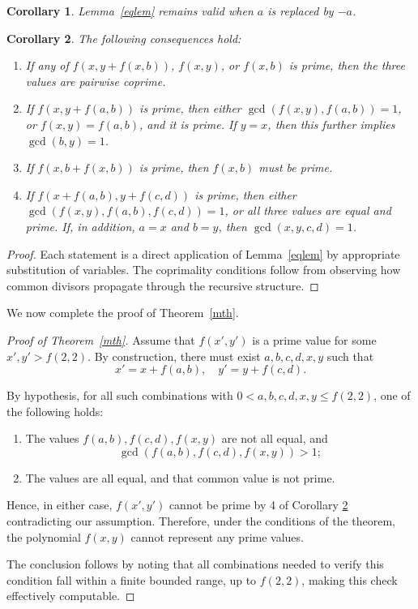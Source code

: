 \documentclass[a4paper,11pt]{article}
\newtheorem{corollary}{Corollary}
\begin{document}
	\begin{corollary}
		Lemma~\ref{eqlem} remains valid when $a$ is replaced by $-a$.
	\end{corollary}
	
	\begin{corollary}\label{cor:m}
		The following consequences hold:
		\begin{enumerate}
			\item If any of $f(x, y + f(x, b))$, $f(x, y)$, or $f(x, b)$ is prime, then the three values are pairwise coprime.
			\item If $f(x, y + f(a, b))$ is prime, then either $\gcd(f(x, y), f(a, b)) = 1$, or $f(x, y) = f(a, b)$, and it is prime. If $y = x$, then this further implies $\gcd(b, y) = 1$.
			\item If $f(x, b + f(x, b))$ is prime, then $f(x, b)$ must be prime.
			\item If $f(x + f(a, b), y + f(c, d))$ is prime, then either $\gcd(f(x, y), f(a, b), f(c, d)) = 1$, or all three values are equal and prime. If, in addition, $a = x$ and $b = y$, then $\gcd(x, y, c, d) = 1$.
		\end{enumerate}
	\end{corollary}
	
	\begin{proof}
		Each statement is a direct application of Lemma~\ref{eqlem} by appropriate substitution of variables. The coprimality conditions follow from observing how common divisors propagate through the recursive structure.
	\end{proof}
	
	We now complete the proof of Theorem~\ref{mth}.
	
	\begin{proof}[Proof of Theorem~\ref{mth}]
		Assume that $f(x', y')$ is a prime value for some $x', y' > f(2, 2)$. By construction, there must exist $a, b, c, d, x, y$ such that
		\[
		x' = x + f(a, b), \quad y' = y + f(c, d).
		\]
		
		By hypothesis, for all such combinations with $0 < a, b, c, d, x, y \leq f(2, 2)$, one of the following holds:
		\begin{enumerate}
			\item The values $f(a, b), f(c, d), f(x, y)$ are not all equal, and
			\[
			\gcd(f(a, b), f(c, d), f(x, y)) > 1;
			\]
			\item The values are all equal, and that common value is not prime.
		\end{enumerate}
		
		Hence, in either case, $f(x', y')$ cannot be prime by 4 of Corollary \ref{cor:m} contradicting our assumption. Therefore, under the conditions of the theorem, the polynomial $f(x, y)$ cannot represent any prime values.
		
		The conclusion follows by noting that all combinations needed to verify this condition fall within a finite bounded range, up to $f(2, 2)$, making this check effectively computable.
	\end{proof}
	
\end{document}

